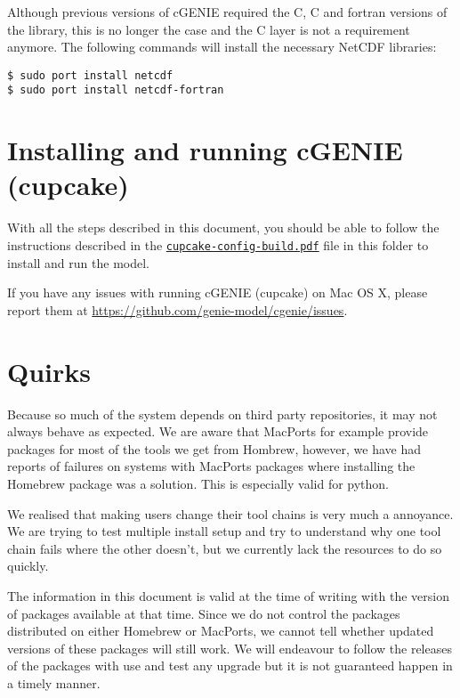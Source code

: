 \documentclass{scrartcl}
\DeclareRobustCommand\Cpp{\hbox{C\hspace{-.05em}\raisebox{.2ex}{\textbf{+\kern-.2ex+}}}}
\begin{document}
Although previous versions of cGENIE required the C, \Cpp{} and fortran versions
of the library, this is no longer the case and the \Cpp{} layer is not a
requirement anymore. The following commands  will install the necessary NetCDF
libraries:

\begin{verbatim}
$ sudo port install netcdf
$ sudo port install netcdf-fortran
\end{verbatim}

\section{Installing and running cGENIE (cupcake)}

With all the steps described in this document, you should be able to follow the
instructions described in the
\href{run:./cupcake-config-build.pdf}{\texttt{cupcake-config-build.pdf}} file
in this folder to install and run the model.

If you have any issues with running cGENIE (cupcake) on Mac OS X, please report
them at \url{https://github.com/genie-model/cgenie/issues}.

\section{Quirks}

Because so much of the system depends on third party repositories, it may not
always behave as expected. We are aware that MacPorts for example provide
packages for most of the tools we get from Hombrew, however, we have had
reports of failures on systems with MacPorts packages where installing the
Homebrew package was a solution. This is especially valid for python.

We realised that making users change their tool chains is very much a
annoyance. We are trying to test multiple install setup and try to understand
why one tool chain fails where the other doesn't, but we currently lack the
resources to do so quickly.

The information in this document is valid at the time of writing with the
version of packages available at that time. Since we do not control the
packages distributed on either Homebrew or MacPorts, we cannot tell whether
updated versions of these packages will still work. We will endeavour to follow
the releases of the packages with use and test any upgrade but it is not
guaranteed happen in a timely manner.
\end{document}
